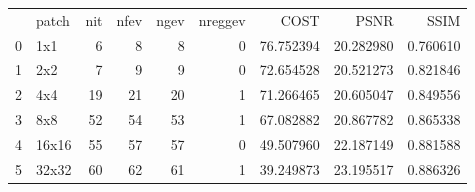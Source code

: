 \begin{tabular}{llrrrrrrr}
 & patch & nit & nfev & ngev & nreggev & COST & PSNR & SSIM \\
0 & 1x1 & 6 & 8 & 8 & 0 & 76.752394 & 20.282980 & 0.760610 \\
1 & 2x2 & 7 & 9 & 9 & 0 & 72.654528 & 20.521273 & 0.821846 \\
2 & 4x4 & 19 & 21 & 20 & 1 & 71.266465 & 20.605047 & 0.849556 \\
3 & 8x8 & 52 & 54 & 53 & 1 & 67.082882 & 20.867782 & 0.865338 \\
4 & 16x16 & 55 & 57 & 57 & 0 & 49.507960 & 22.187149 & 0.881588 \\
5 & 32x32 & 60 & 62 & 61 & 1 & 39.249873 & 23.195517 & 0.886326 \\
\end{tabular}

